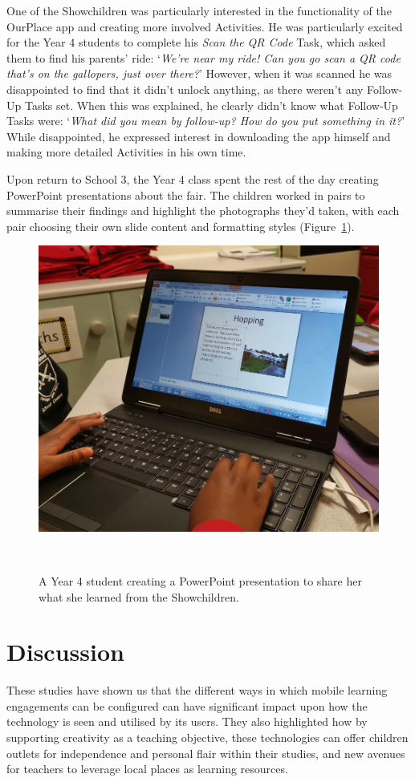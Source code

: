 \documentclass[,hyphens]{sigchi}
\begin{document}
One of the Showchildren was particularly interested in the functionality of the OurPlace app and creating more involved Activities. He was particularly excited for the Year 4 students to complete his \textit{Scan the QR Code} Task, which asked them to find his parents' ride: `\textit{We're near my ride! Can you go scan a QR code that's on the gallopers, just over there?}' However, when it was scanned he was disappointed to find that it didn't unlock anything, as there weren't any Follow-Up Tasks set. When this was explained, he clearly didn't know what Follow-Up Tasks were: `\textit{What did you mean by follow-up? How do you put something in it?}' While disappointed, he expressed interest in downloading the app himself and making more detailed Activities in his own time.

Upon return to School 3, the Year 4 class spent the rest of the day creating PowerPoint presentations about the fair. The children worked in pairs to summarise their findings and highlight the photographs they'd taken, with each pair choosing their own slide content and formatting styles (Figure~\ref{fig:Laptop}). 

\begin{figure}
\centering
  \includegraphics[width=1\columnwidth]{figures/laptop}
  \caption{ A Year 4 student creating a PowerPoint presentation to share her what she learned from the Showchildren. }~\label{fig:Laptop}
\end{figure}

\section{Discussion}
These studies have shown us that the different ways in which mobile learning engagements can be configured can have significant impact upon how the technology is seen and utilised by its users. They also highlighted how by supporting creativity as a teaching objective, these technologies can offer children outlets for independence and personal flair within their studies, and new avenues for teachers to leverage local places as learning resources.
\end{document}
